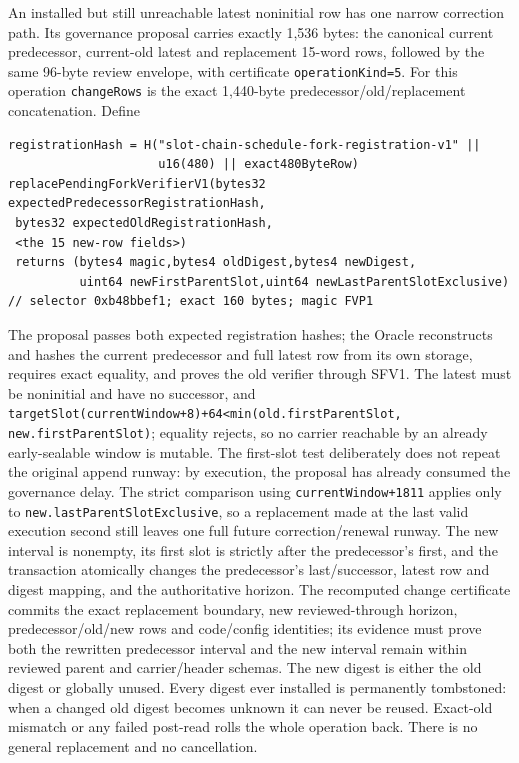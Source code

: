 \documentclass[a4paper,11pt]{article}
\newcommand{\code}[1]{\nolinkurl{#1}}
\begin{document}
An installed but still unreachable latest noninitial row has one narrow
correction path.  Its governance proposal carries exactly 1,536 bytes: the
canonical current predecessor, current-old latest and replacement 15-word
rows, followed by the same 96-byte review envelope, with certificate
\code{operationKind=5}.  For this operation \code{changeRows} is the exact
1,440-byte predecessor/old/replacement concatenation.  Define
\begin{verbatim}
registrationHash = H("slot-chain-schedule-fork-registration-v1" ||
                     u16(480) || exact480ByteRow)
replacePendingForkVerifierV1(bytes32 expectedPredecessorRegistrationHash,
 bytes32 expectedOldRegistrationHash,
 <the 15 new-row fields>)
 returns (bytes4 magic,bytes4 oldDigest,bytes4 newDigest,
          uint64 newFirstParentSlot,uint64 newLastParentSlotExclusive)
// selector 0xb48bbef1; exact 160 bytes; magic FVP1
\end{verbatim}
The proposal passes both expected registration hashes; the Oracle
reconstructs and hashes the current predecessor and full latest row from its
own storage, requires exact equality, and proves the old verifier through
SFV1.  The latest
must be noninitial and have no
successor, and
\code{targetSlot(currentWindow+8)+64<min(old.firstParentSlot,
new.firstParentSlot)}; equality rejects, so no carrier reachable by an already
early-sealable window is mutable.  The first-slot test deliberately does not
repeat the original append runway: by execution, the proposal has already
consumed the governance delay.  The strict comparison using
\code{currentWindow+1811} applies only to
\code{new.lastParentSlotExclusive}, so a replacement made at the last valid
execution second still leaves one full future correction/renewal runway.  The
new interval is nonempty, its first slot is strictly after the
predecessor's first, and the transaction atomically changes the predecessor's
last/successor, latest row and digest mapping, and the authoritative horizon.
The recomputed change certificate commits the exact replacement
boundary, new reviewed-through horizon, predecessor/old/new rows and code/config
identities; its evidence must prove both the rewritten predecessor interval
and the new interval remain within reviewed parent and carrier/header schemas.
The new digest is either the old digest or globally unused.  Every digest ever
installed is permanently tombstoned: when a changed old digest becomes unknown
it can never be reused.  Exact-old mismatch or any failed post-read rolls the
whole operation back.  There is no general replacement and no cancellation.
\end{document}
